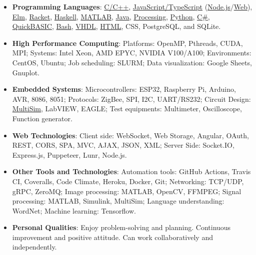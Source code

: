 \begin{itemize}[noitemsep, leftmargin=*]
  \item \textbf{Programming Languages}:
    \href{https://github.com/puzzlef}{C/C++},
    \href{https://github.com/javascriptf}{JavaScript/TypeScript} (\href{https://github.com/nodef}{Node.js}/\href{https://github.com/htmlf}{Web}),
    \href{https://github.com/elmw}{Elm},
    \href{https://github.com/racketf}{Racket},
    \href{https://github.com/interpreterz}{Haskell},
    \href{https://github.com/matlabf}{MATLAB},
    \href{https://github.com/javaf}{Java},
    \href{https://github.com/processingf}{Processing},
    \href{https://github.com/python3f}{Python},
    \href{https://github.com/winp}{C\#},
    \href{https://github.com/qb40}{QuickBASIC},
    \href{https://github.com/bashf}{Bash},
    \href{https://github.com/vhdlf}{VHDL},
    \href{https://github.com/htmlf}{HTML},
    CSS, PostgreSQL, and SQLite.
  \item \textbf{High Performance Computing}:
    Platforms: OpenMP, Pthreads, CUDA, MPI;
    Systems: Intel Xeon, AMD EPYC, NVIDIA V100/A100;
    Environments: CentOS, Ubuntu;
    Job scheduling: SLURM;
    Data visualization: Google Sheets, Gnuplot.
  \item \textbf{Embedded Systems}:
    Microcontrollers: ESP32, Raspberry Pi, Arduino, AVR, 8086, 8051;
    Protocols: ZigBee, SPI, I2C, UART/RS232;
    Circuit Design: \href{https://github.com/electronicsf}{MultiSim}, LabVIEW, EAGLE;
    Test equipments: Multimeter, Oscilloscope, Function generator.
  \item \textbf{Web Technologies}:
    Client side: WebSocket, Web Storage, Angular, OAuth, REST, CORS, SPA, MVC, AJAX, JSON, XML;
    Server Side: Socket.IO, Express.js, Puppeteer, Lunr, Node.js.
  \item \textbf{Other Tools and Technologies}:
    Automation tools: GitHub Actions, Travis CI, Coveralls, Code Climate, Heroku, Docker, Git;
    Networking: TCP/UDP, gRPC, ZeroMQ;
    Image processing: MATLAB, OpenCV, FFMPEG;
    Signal processing: MATLAB, Simulink, MultiSim;
    Language understanding: WordNet;
    Machine learning: Tensorflow.
  \item \textbf{Personal Qualities}:
    Enjoy problem-solving and planning.
    Continuous improvement and positive attitude.
    Can work collaboratively and independently.
\end{itemize}
